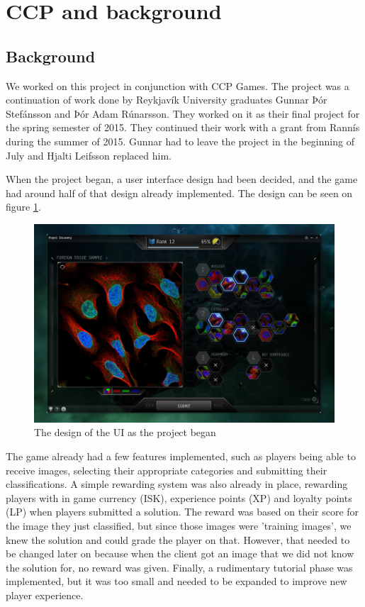 \section{CCP and background}\label{sec:ccp}

\subsection{Background}

We worked on this project in conjunction with CCP Games. The project was a continuation of work done by Reykjavík University graduates Gunnar Þór Stefánsson and Þór Adam Rúnarsson. They worked on it as their final project for the spring semester of 2015. They continued their work with a grant from Rannís during the summer of 2015. Gunnar had to leave the project in the beginning of July and Hjalti Leifsson replaced him. 

When the project began, a user interface design had been decided, and the game had around half of that design already implemented. The design can be seen on figure \ref{fig:PD}.

\begin{figure}[H]
	\centering
	\graphicspath{ {./graphics/} }
    \centerline{\includegraphics[scale=0.35]{PD.png}}
    \caption{\label{fig:PD}The design of the UI as the project began}
\end{figure}

The game already had a few features implemented, such as players being able to receive images, selecting their appropriate categories and submitting their classifications. A simple rewarding system was also already in place, rewarding players with in game currency (ISK), experience points (XP) and loyalty points (LP) when players submitted a solution. The reward was based on their score for the image they just classified, but since those images were 'training images', we knew the solution and could grade the player on that. However, that needed to be changed later on because when the client got an image that we did not know the solution for, no reward was given. Finally, a rudimentary tutorial phase was implemented, but it was too small and needed to be expanded to improve new player experience.

